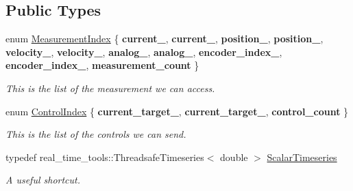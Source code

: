 \subsection*{Public Types}
\begin{DoxyCompactItemize}
\item 
\mbox{\label{classblmc__drivers_1_1MotorBoardInterface_a8e869cbdb9fcc872ba5a33813e0dfafb}} 
enum \hyperlink{classblmc__drivers_1_1MotorBoardInterface_a8e869cbdb9fcc872ba5a33813e0dfafb}{Measurement\+Index} \{ \newline
{\bfseries current\+\_}, 
{\bfseries current\+\_}, 
{\bfseries position\+\_}, 
{\bfseries position\+\_}, 
\newline
{\bfseries velocity\+\_}, 
{\bfseries velocity\+\_}, 
{\bfseries analog\+\_}, 
{\bfseries analog\+\_}, 
\newline
{\bfseries encoder\+\_\+index\+\_}, 
{\bfseries encoder\+\_\+index\+\_}, 
{\bfseries measurement\+\_\+count}
 \}\begin{DoxyCompactList}\small\item\em This is the list of the measurement we can access. \end{DoxyCompactList}
\item 
\mbox{\label{classblmc__drivers_1_1MotorBoardInterface_a82ed4d0fa527521707281396095a88ca}} 
enum \hyperlink{classblmc__drivers_1_1MotorBoardInterface_a82ed4d0fa527521707281396095a88ca}{Control\+Index} \{ {\bfseries current\+\_\+target\+\_}, 
{\bfseries current\+\_\+target\+\_}, 
{\bfseries control\+\_\+count}
 \}\begin{DoxyCompactList}\small\item\em This is the list of the controls we can send. \end{DoxyCompactList}
\item 
\mbox{\label{classblmc__drivers_1_1MotorBoardInterface_a14e237254ba495a66091ea3a3a33fa75}} 
typedef real\+\_\+time\+\_\+tools\+::\+Threadsafe\+Timeseries$<$ double $>$ \hyperlink{classblmc__drivers_1_1MotorBoardInterface_a14e237254ba495a66091ea3a3a33fa75}{Scalar\+Timeseries}
\begin{DoxyCompactList}\small\item\em A useful shortcut. \end{DoxyCompactList}\item 

\end{DoxyCompactItemize}
